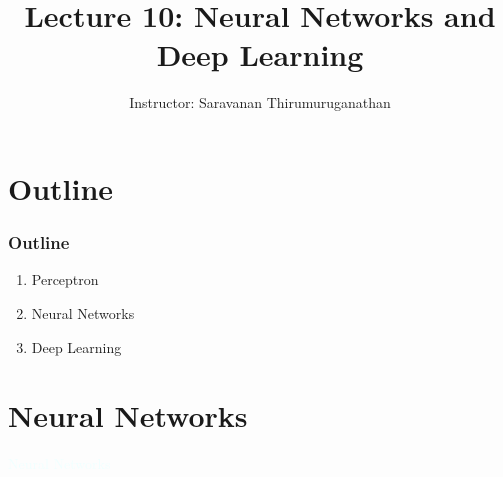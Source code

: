 \documentclass{beamer}
\title[Saravanan Thirumuruganathan] 
{Lecture 10: Neural Networks and Deep Learning}
\author[CSE 5334, Data Mining] 
{Instructor: Saravanan Thirumuruganathan}
\date[]
\newcommand{\thblue}[1]{{\Huge {\textcolor{azure}{#1}}}}
\begin{document}
\begin{frame}
  \titlepage
\end{frame}


\section{Outline}

\begin{frame}
\frametitle {Outline}
    \begin{enumerate}
        \item Perceptron
        \item Neural Networks
        \item Deep Learning
    \end{enumerate}
\end{frame}




\section{Neural Networks}
\begin{frame}{} 
    \begin{center}
        \thblue{Neural Networks}
    \end{center}
\end{frame}
\end{document}
